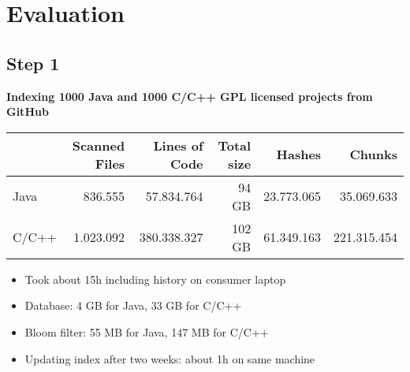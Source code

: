 
\section{Evaluation}
\subsection{Step 1}
\begin{frame}{\insertsubsection}
	\textbf{Indexing 1000 Java and 1000 C/C++ GPL licensed projects from GitHub}
	
	\begin{table}[ht]
		\centering
		\scriptsize
		\begin{tabular}{l|rrrrr}
			& \textbf{Scanned Files} & \textbf{Lines of Code} & \textbf{Total size} & \textbf{Hashes} & \textbf{Chunks} \\ 
			\hline 
			Java & 836.555 & 57.834.764 & 94 GB & 23.773.065 & 35.069.633 \\
			C/C++ & 1.023.092 & 380.338.327 & 102 GB & 61.349.163 & 221.315.454 \\ 
		\end{tabular}
	\end{table}

	\begin{itemize}
		\small
		\item Took about 15h including history on consumer laptop
		\item Database: 4 GB for Java, 33 GB for C/C++
		\item Bloom filter: 55 MB for Java, 147 MB for C/C++
		\item Updating index after two weeks: about 1h on same machine
	\end{itemize}
\end{frame}

